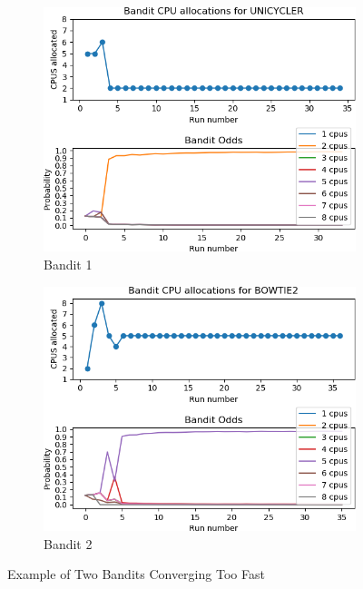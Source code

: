 \begin{figure}[ht]
\centering
\begin{subfigure}{.5\textwidth}
  \includegraphics[width=\textwidth,height=\textwidth]{fig/old_UNICYCLER.png}
  \caption{Bandit 1}
  \label{fig:sub1}
\end{subfigure}%
\begin{subfigure}{.5\textwidth}
  \includegraphics[width=\textwidth,height=\textwidth]{fig/old_BOWTIE2.png}
  \caption{Bandit 2}
  \label{fig:sub2}
\end{subfigure}
\caption{Example of Two Bandits Converging Too Fast}
\end{figure}

